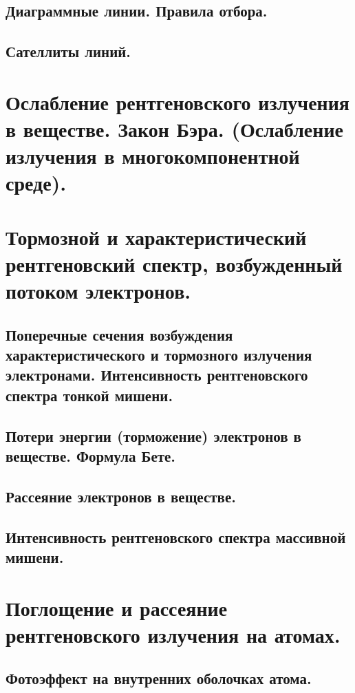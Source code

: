 \documentclass[a4paper,14pt, openany, twoside, draft]{extbook} %
\begin{document}
\section{Диаграммные линии. Правила отбора.}
\label{sec:diag-lines}

\section{Сателлиты линий.}
\label{sec:sat-lines}

\chapter{Ослабление рентгеновского излучения в веществе. Закон Бэра. (Ослабление излучения в многокомпонентной среде). }
\label{cha:baer}

\chapter{Тормозной и характеристический рентгеновский спектр, возбужденный потоком электронов. }
\label{cha:torm-spec}

\section{Поперечные сечения возбуждения характеристического и тормозного излучения электронами. Интенсивность рентгеновского спектра тонкой мишени. }
\label{sec:sections}

\section{Потери энергии (торможение) электронов в веществе. Формула Бете. }
\section{Рассеяние электронов в веществе.}
\section{Интенсивность рентгеновского спектра массивной мишени.}

\chapter{Поглощение и рассеяние рентгеновского излучения на атомах. }
\label{cha:absorbtion}

\section{Фотоэффект на внутренних оболочках атома. }
\end{document}
